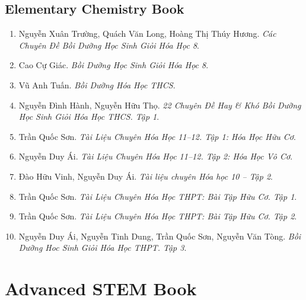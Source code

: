 \documentclass{article}
\numberwithin{equation}{section}
\begin{document}
\subsection{Elementary Chemistry Book}
\begin{enumerate}
	\item Nguyễn Xuân Trường, Quách Văn Long, Hoàng Thị Thúy Hương. \textit{Các Chuyên Đề Bồi Dưỡng Học Sinh Giỏi Hóa Học 8}.
	\item Cao Cự Giác. \textit{Bồi Dưỡng Học Sinh Giỏi Hóa Học 8}.
	\item Vũ Anh Tuấn. \textit{Bồi Dưỡng Hóa Học THCS}.
	\item Nguyễn Đình Hành, Nguyễn Hữu Thọ. \textit{22 Chuyên Đề Hay \& Khó Bồi Dưỡng Học Sinh Giỏi Hóa Học THCS. Tập 1}.
	\item Trần Quốc Sơn. \textit{Tài Liệu Chuyên Hóa Học 11--12. Tập 1: Hóa Học Hữu Cơ}.
	\item Nguyễn Duy Ái. \textit{Tài Liệu Chuyên Hóa Học 11--12. Tập 2: Hóa Học Vô Cơ}.
	\item Đào Hữu Vinh, Nguyễn Duy Ái. \textit{Tài liệu chuyên Hóa học 10 -- Tập 2}.
	\item Trần Quốc Sơn. \textit{Tài Liệu Chuyên Hóa Học THPT: Bài Tập Hữu Cơ. Tập 1}.
	\item Trần Quốc Sơn. \textit{Tài Liệu Chuyên Hóa Học THPT: Bài Tập Hữu Cơ. Tập 2}.
	\item Nguyễn Duy Ái, Nguyễn Tinh Dung, Trần Quốc Sơn, Nguyễn Văn Tòng. \textit{Bồi Dưỡng Hoc Sinh Giỏi Hóa Học THPT. Tập 3}.
\end{enumerate}


\section{Advanced STEM Book}
\end{document}
